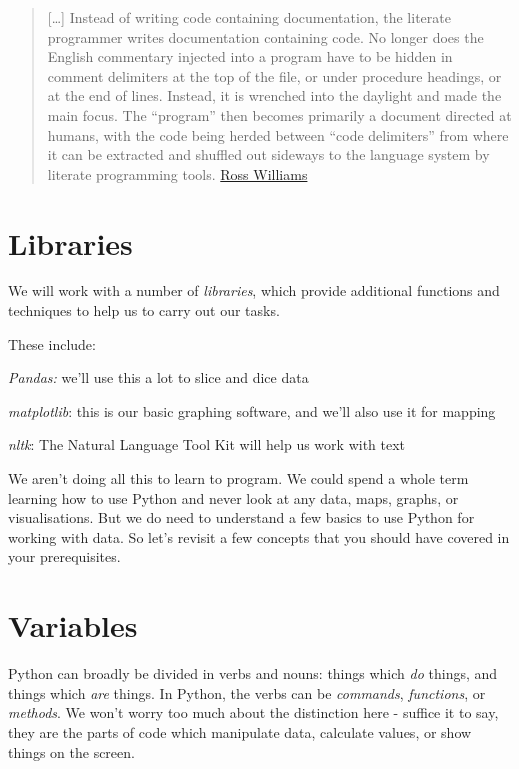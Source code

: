 \documentclass[
  letterpaper,
  DIV=11,
  numbers=noendperiod]{scrreprt}
\begin{document}
\begin{quote}
{[}\ldots{]} Instead of writing code containing documentation, the
literate programmer writes documentation containing code. No longer does
the English commentary injected into a program have to be hidden in
comment delimiters at the top of the file, or under procedure headings,
or at the end of lines. Instead, it is wrenched into the daylight and
made the main focus. The ``program'' then becomes primarily a document
directed at humans, with the code being herded between ``code
delimiters'' from where it can be extracted and shuffled out sideways to
the language system by literate programming tools.
\href{http://www.literateprogramming.com/lpquotes.html}{Ross Williams}
\end{quote}

\hypertarget{libraries}{%
\section{Libraries}\label{libraries}}

We will work with a number of \emph{libraries}, which provide additional
functions and techniques to help us to carry out our tasks.

These include:

\emph{Pandas:} we'll use this a lot to slice and dice data

\emph{matplotlib}: this is our basic graphing software, and we'll also
use it for mapping

\emph{nltk}: The Natural Language Tool Kit will help us work with text

We aren't doing all this to learn to program. We could spend a whole
term learning how to use Python and never look at any data, maps,
graphs, or visualisations. But we do need to understand a few basics to
use Python for working with data. So let's revisit a few concepts that
you should have covered in your prerequisites.

\hypertarget{variables}{%
\section{Variables}\label{variables}}

Python can broadly be divided in verbs and nouns: things which \emph{do}
things, and things which \emph{are} things. In Python, the verbs can be
\emph{commands}, \emph{functions}, or \emph{methods}. We won't worry too
much about the distinction here - suffice it to say, they are the parts
of code which manipulate data, calculate values, or show things on the
screen.
\end{document}
